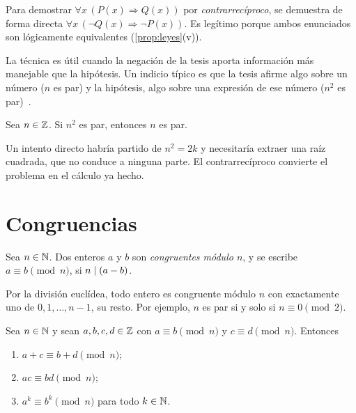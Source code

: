 \begin{definicion}\label{def:contrarreciproco}
Para demostrar $\forall x\,(P(x)\Rightarrow Q(x))$ por \emph{contrarrecíproco}, se demuestra de forma directa $\forall x\,(\neg Q(x)\Rightarrow\neg P(x))$. Es legítimo porque ambos enunciados son lógicamente equivalentes (\cref{prop:leyes}(v)).
\end{definicion}

La técnica es útil cuando la negación de la tesis aporta información más manejable que la hipótesis. Un indicio típico es que la tesis afirme algo sobre un número ($n$ es par) y la hipótesis, algo sobre una expresión de ese número ($n^{2}$ es par)~\cite[§5.1]{hammack}.

\begin{proposicion}\label{prop:cuadrado-par}
Sea $n\in\mathbb{Z}$. Si $n^{2}$ es par, entonces $n$ es par.
\end{proposicion}

Un intento directo habría partido de $n^{2}=2k$ y necesitaría extraer una raíz cuadrada, que no conduce a ninguna parte. El contrarrecíproco convierte el problema en el cálculo ya hecho.

\addtocounter{definicion}{1}%

\section{Congruencias}

\begin{definicion}[Congruencia]\label{def:congruencia}
Sea $n\in\mathbb{N}$. Dos enteros $a$ y $b$ son \emph{congruentes módulo $n$}, y se escribe $a\equiv b\pmod n$, si $n\mid(a-b)$.
\end{definicion}

Por la división euclídea, todo entero es congruente módulo $n$ con exactamente uno de $0,1,\dots,n-1$, su resto. Por ejemplo, $n$ es par si y solo si $n\equiv 0\pmod 2$.

\begin{proposicion}\label{prop:congruencias}
Sea $n\in\mathbb{N}$ y sean $a,b,c,d\in\mathbb{Z}$ con $a\equiv b\pmod n$ y $c\equiv d\pmod n$. Entonces
\begin{enumerate}
  \item $a+c\equiv b+d\pmod n$;
  \item $ac\equiv bd\pmod n$;
  \item $a^{k}\equiv b^{k}\pmod n$ para todo $k\in\mathbb{N}$.
\end{enumerate}
\end{proposicion}

